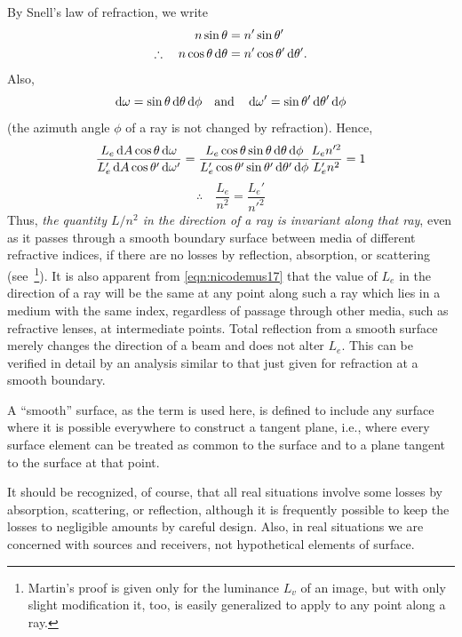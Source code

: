 \begin{refsection}
By Snell's law of refraction, we write
\begin{align}
n\sin\theta &= n' \sin \theta' \\
\therefore\quad n\cos\theta \mathop{}\!\mathrm{d} \theta &= n' \cos\theta' \mathop{}\!\mathrm{d} \theta'.
\end{align}
Also,
\begin{equation}
\d\omega = \sin\theta\d\theta \d\phi
\quad \textrm{and} \quad
\d\omega' = \sin\theta'\d\theta' \d\phi
\end{equation}
(the azimuth angle $\phi$ of a ray is not changed by refraction). Hence,
\begin{equation*}
\frac{L_e \d A \cos\theta \d\omega}{L_e' \d A \cos\theta' \d\omega'} =
\frac{L_e \cos\theta \sin\theta \d\theta \d\phi}{L_e' \cos\theta' \sin\theta' \d\theta' \d\phi}
\frac{L_e n'^2}{L_e' n^2} = 1
\end{equation*}
\begin{equation}
\therefore\quad \frac{L_e}{n^2} = \frac{L_e'}{n'^2} \label{eqn:nicodemus17}
\end{equation}
Thus, \emph{the quantity $L / n^2$ in the direction of a ray is invariant along
that ray}, even as it passes through a smooth boundary surface between media of
different refractive indices, if there are no losses by reflection, absorption,
or scattering (see~\cite{martin60}\footnote{\label{note:nicodemus8}Martin's proof is given
only for the luminance $L_v$ of an image\cite[pp.
266--268]{martin60}, but with
only slight modification it, too, is easily generalized to apply to any
point along a ray.}). It is also apparent from \cref{eqn:nicodemus17}
that the value of $L_e$ in the direction of a ray will be the same at any
point along such a ray which lies in a medium with the same index, regardless
of passage through other media, such as refractive lenses, at intermediate
points.
Total reflection from a smooth surface merely changes the direction of a
beam and does not alter $L_e$. This can be verified in detail by an analysis
similar to that just given for refraction at a smooth boundary.

A “smooth” surface, as the term is used here, is defined to include any
surface where it is possible everywhere to construct a tangent plane,
i.e., where every surface element can be treated as common to the
surface and to a plane tangent to the surface at that point.

It should be recognized, of course, that all real situations involve
some losses by absorption, scattering, or reflection, although it is
frequently possible to keep the losses to negligible amounts
by careful design. Also, in real situations we are concerned with sources
and receivers, not hypothetical elements of surface.


\end{refsection}
